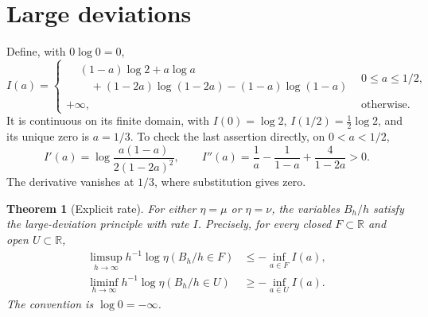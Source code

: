 \documentclass[11pt,letterpaper]{article}
\newcommand{\R}{\mathbb{R}}
\newtheorem{theorem}{Theorem}
\begin{document}
\section{Large deviations}

Define, with \(0\log0=0\),
\[
I(a)=
\begin{cases}
\begin{aligned}
&(1-a)\log2+a\log a\\
&\quad +(1-2a)\log(1-2a)-(1-a)\log(1-a)
\end{aligned}
&0\le a\le1/2,\\
+\infty,&\text{otherwise}.
\end{cases}
\]
It is continuous on its finite domain, with \(I(0)=\log2\),
\(I(1/2)=\tfrac12\log2\), and its unique zero is \(a=1/3\).
To check the last assertion directly, on \(0<a<1/2\),
\[
I'(a)=\log\frac{a(1-a)}{2(1-2a)^2},\qquad
I''(a)=\frac1a-\frac1{1-a}+\frac4{1-2a}>0.
\]
The derivative vanishes at \(1/3\), where substitution gives zero.

\begin{theorem}[Explicit rate]
\label{thm:rate}
For either \(\eta=\mu\) or \(\eta=\nu\), the variables \(B_h/h\)
satisfy the large-deviation principle with rate \(I\). Precisely,
for every closed \(F\subset\R\) and open \(U\subset\R\),
\[
\begin{aligned}
\limsup_{h\to\infty}h^{-1}\log\eta(B_h/h\in F)
&\le-\inf_{a\in F}I(a),\\
\liminf_{h\to\infty}h^{-1}\log\eta(B_h/h\in U)
&\ge-\inf_{a\in U}I(a).
\end{aligned}
\]
The convention is \(\log0=-\infty\).
\end{theorem}
\end{document}
